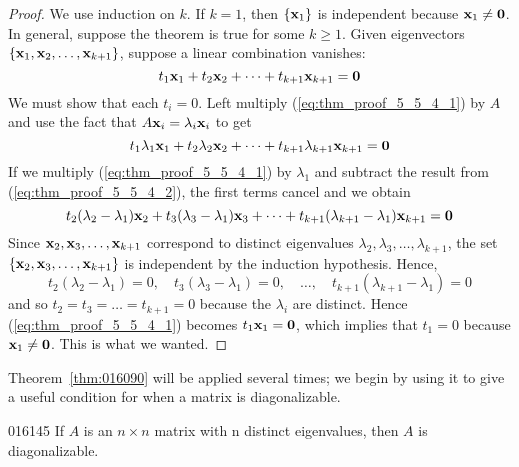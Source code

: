 \begin{proof}
We use induction on $k$. If $k = 1$, then $\{\textbf{x}_{1}\}$ is independent because $\textbf{x}_{1} \neq \textbf{0}$. In general, suppose the theorem is true for some $k \geq 1$. Given eigenvectors $\{\textbf{x}_{1}, \textbf{x}_{2}, \dots, \textbf{x}_{k+1}\}$, suppose a linear combination vanishes:
\begin{equation}
\label{eq:thm_proof_5_5_4_1}
t_1\textbf{x}_1 + t_2\textbf{x}_2 + \dots + t_{k+1}\textbf{x}_{k+1} = \textbf{0}
\end{equation}
We must show that each $t_{i} = 0$. Left multiply (\ref{eq:thm_proof_5_5_4_1}) by $A$ and use the fact that $A\textbf{x}_{i} = \lambda_{i}\textbf{x}_{i}$ to get
\begin{equation}
\label{eq:thm_proof_5_5_4_2}
t_1\lambda_1\textbf{x}_1 + t_2\lambda_2\textbf{x}_2 + \dots + t_{k+1}\lambda_{k+1}\textbf{x}_{k+1} = \textbf{0}
\end{equation}
If we multiply (\ref{eq:thm_proof_5_5_4_1}) by $\lambda_{1}$ and subtract the result from (\ref{eq:thm_proof_5_5_4_2}), the first terms cancel and we obtain
\begin{equation*}
t_2(\lambda_2 - \lambda_1)\textbf{x}_2 + t_3(\lambda_3 - \lambda_1)\textbf{x}_3 + \dots + t_{k+1}(\lambda_{k+1} - \lambda_1)\textbf{x}_{k+1} = \textbf{0}
\end{equation*}
Since $\textbf{x}_{2}, \textbf{x}_{3}, \dots, \textbf{x}_{k+1}$
correspond to distinct eigenvalues $\lambda_{2}, \lambda_{3}, \dots, \lambda_{k+1}$, the set $\{\textbf{x}_{2}, \textbf{x}_{3}, \dots, \textbf{x}_{k+1}\}$ is independent by the induction hypothesis. Hence,
\begin{equation*}
t_2(\lambda_2 - \lambda_1) = 0, \quad t_3(\lambda_3 - \lambda_1) = 0, \quad \dots, \quad t_{k+1}(\lambda_{k+1} - \lambda_1) = 0
\end{equation*}
and so $t_{2} = t_{3} = \dots = t_{k+1} = 0$ because the $\lambda_{i}$ are distinct. Hence (\ref{eq:thm_proof_5_5_4_1}) becomes $t_{1}\textbf{x}_{1} = \textbf{0}$, which implies that $t_{1} = 0$ because $\textbf{x}_{1} \neq \textbf{0}$. This is what we wanted.
\end{proof}

Theorem~\ref{thm:016090} will be applied several times; we begin by using it to give a useful condition for when a matrix is diagonalizable.

\begin{theorem}{}{016145}
If $A$ is an $n \times n$ matrix with n distinct eigenvalues, then $A$ is diagonalizable.
\end{theorem}

